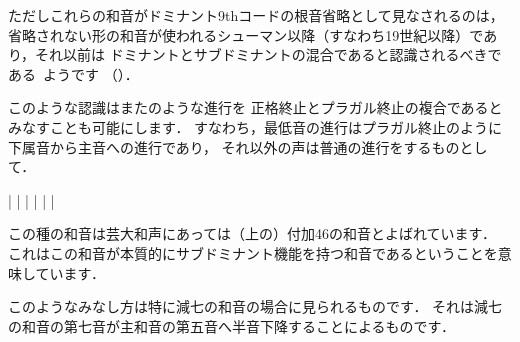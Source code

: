 \documentclass[dvipdfmx,uplatex,b5paper,openany,jbase=12Q,nomag*,textwidth-limit=44%
               ]{gachimuchi}
\begin{document}
\begin{Yodan}
ただしこれらの和音がドミナント\supsc{(\txFlat)}9thコードの根音省略として見なされるのは，
省略されない形の和音が使われるシューマン以降（すなわち19世紀以降）であり，それ以前は
ドミナントとサブドミナントの混合であると認識されるべきである~\cite{chDIETHER1}ようです
（）．

\begin{Music}[0.6\linewidth]
  \nostartrule%
  \Startpiece%
  \NOtes%
  \en{}\changecontext%
  \NOtes%
  \en%
  \endpiece%
\end{Music}

このような認識はまたのような進行を
正格終止とプラガル終止の複合であるとみなすことも可能にします．
すなわち，最低音の進行はプラガル終止のように下属音から主音への進行であり，
それ以外の声は普通の進行をするものとして．

\begin{Music}[0.6\linewidth]
  \Startpiece%
  \NOTEs%
  |%
  \en\bar%
  \NOTEs%
  |%
  \en{}\setdoublebar\changecontext%
  \NOTEs%
  |%
  \en\bar%
  \NOTEs%
  |%
  \en\setdoublebar%
  \endpiece%
\end{Music}

この種の和音は芸大和声にあっては（\Gniv 上の）付加\subsupsc46の和音とよばれています\cite[p.91]{chSHIMAOKA1ii}．
これはこの和音が本質的にサブドミナント機能を持つ和音であるということを意味しています．

このようなみなし方は特に減七の和音の場合に見られるものです．
それは減七の和音の第七音が主和音の第五音へ半音下降することによるものです．

\end{Yodan}
\end{document}
